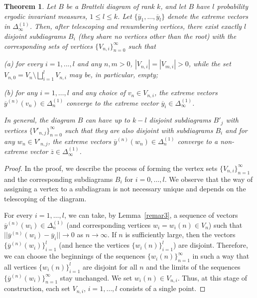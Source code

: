 \documentclass[11pt, english, reqno]{amsart}
\theoremstyle{definition}
\theoremstyle{remark}
\theoremstyle{plain}
\newtheorem{thm}[defin]{Theorem}
\def\ov{\overline}
\numberwithin{equation}{section}
\begin{document}
{\begin{thm}\label{prop subdiagrams}
Let $B$ be a Bratteli diagram of rank $k$, and let $B$ have $l$ probability
ergodic invariant measures, $1 \leq l \leq k$. Let $\{\ov y_1, ... , \ov y_l\}$ denote the extreme vectors in $\Delta_{\infty}^{(1)}$.
Then, after telescoping and
renumbering  vertices, there exist exactly $l$ disjoint subdiagrams $B_i$
(they share no vertices other than the root) with the corresponding sets of vertices $\{V_{n,i}\}_{n = 0}^{\infty}$
such that

(a) for every $i = 1,...,l$ and any $n,m >0$, $|V_{n,i}| = |V_{m,i}| > 0$,
while the set $V_{n,0} = V_n \setminus \bigsqcup\limits_{i = 1}^l V_{n,i}$ may be, in particular, empty;


(b) for any $i = 1, \ldots, l$ and any choice of $v_n \in V_{n,i}$, the extreme vectors $\ov y^{(n)}
(v_n) \in \Delta_n^{(1)}$ converge to the extreme vector $\ov y_i \in
\Delta_{\infty}^{(1)}$.

In general, the diagram $B$ can have up to $k - l$ disjoint subdiagrams
$B'_j$ with vertices $\{V'_{n,j}\}_{n = 0}^{\infty}$ such that they are
 also disjoint with subdiagrams $B_i$ and for any $w_n \in V'_{n,j}$, the
  extreme vectors $\ov y^{(n)}(w_n) \in \Delta_n^{(1)}$ converge to a
  non-extreme vector $\ov z \in \Delta_{\infty}^{(1)}$.
\end{thm}

\begin{proof} In the proof, we describe the process of forming the 
vertex sets $\{V_{n,i}\}_{n = 1}^{\infty}$  and the 
corresponding subdiagrams $B_i$ for $i = 0, \ldots, l$. We observe that the
 way of assigning a vertex to a subdiagram is not necessary unique and
 depends on the telescoping of the diagram. 
 
 For every $i = 1,\ldots,l$, we
  can take, by Lemma~\ref{remar3},  a sequence of vectors 
  $\ov y^{(n)}(w_i) \in \Delta_n^{(1)}$ (and
 corresponding vertices $w_i = w_i(n) \in V_n$)
such that $||\ov y^{(n)}(w_i) - \ov y_i|| \rightarrow 0$ as $n \rightarrow
\infty$. If $n$ is sufficiently large, then the vectors 
$\{\ov y^{(n)}(w_i)\}_{i = 1}^{l}$ (and hence the vertices $\{w_i(n)\}_{i = 
1}^{l}$) are disjoint. Therefore, we can choose the beginnings of the 
sequences $\{w_i(n)\}_{n = 1}^{\infty}$ in such a way that all vertices 
$\{w_i(n)\}_{i = 1}^{l}$ are disjoint for all $n$ and the limits of the 
sequences $\{\ov y^{(n)}(w_i)\}_{n = 1}^{\infty}$ stay unchanged. We set 
$w_i(n) \in V_{n,i}$. Thus, at this stage of construction, each set $V_{n,i}$, 
$i = 1, \ldots, l$ consists of a single point.


\end{proof}}
\end{document}
